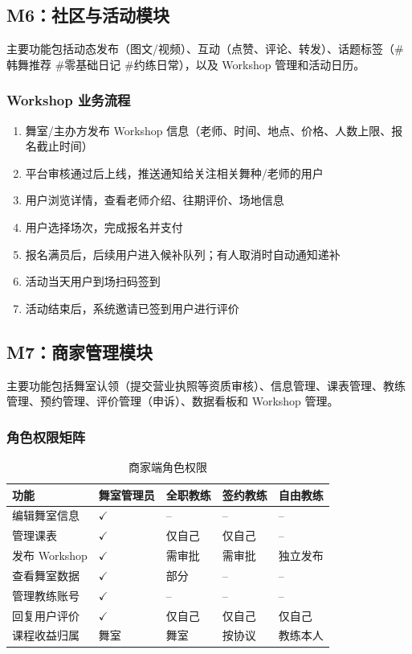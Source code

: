 \documentclass[12pt,a4paper]{ctexart}
\begin{document}
\subsection{M6：社区与活动模块}

主要功能包括动态发布（图文/视频）、互动（点赞、评论、转发）、话题标签（\#韩舞推荐 \#零基础日记 \#约练日常），以及 Workshop 管理和活动日历。

\subsubsection{Workshop 业务流程}

\begin{enumerate}
    \item 舞室/主办方发布 Workshop 信息（老师、时间、地点、价格、人数上限、报名截止时间）
    \item 平台审核通过后上线，推送通知给关注相关舞种/老师的用户
    \item 用户浏览详情，查看老师介绍、往期评价、场地信息
    \item 用户选择场次，完成报名并支付
    \item 报名满员后，后续用户进入候补队列；有人取消时自动通知递补
    \item 活动当天用户到场扫码签到
    \item 活动结束后，系统邀请已签到用户进行评价
\end{enumerate}

\subsection{M7：商家管理模块}

主要功能包括舞室认领（提交营业执照等资质审核）、信息管理、课表管理、教练管理、预约管理、评价管理（申诉）、数据看板和 Workshop 管理。

\subsubsection{角色权限矩阵}

\begin{table}[H]
\centering
\caption{商家端角色权限}
\begin{tabularx}{\textwidth}{L{2.8cm}C{2cm}C{2cm}C{2cm}C{2cm}}
\toprule
\textbf{功能} & \textbf{舞室管理员} & \textbf{全职教练} & \textbf{签约教练} & \textbf{自由教练} \\
\midrule
编辑舞室信息 & $\checkmark$ & -- & -- & -- \\
管理课表 & $\checkmark$ & 仅自己 & 仅自己 & -- \\
发布 Workshop & $\checkmark$ & 需审批 & 需审批 & 独立发布 \\
查看舞室数据 & $\checkmark$ & 部分 & -- & -- \\
管理教练账号 & $\checkmark$ & -- & -- & -- \\
回复用户评价 & $\checkmark$ & 仅自己 & 仅自己 & 仅自己 \\
课程收益归属 & 舞室 & 舞室 & 按协议 & 教练本人 \\
\bottomrule
\end{tabularx}
\end{table}
\end{document}
